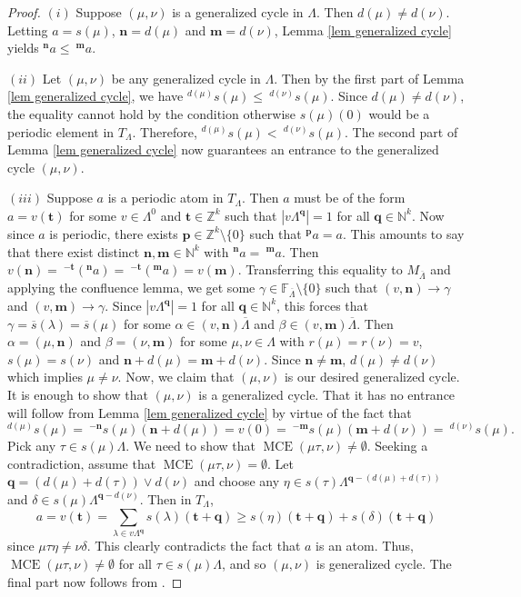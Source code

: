 \documentclass[a4paper,reqno,12pt]{amsart}
\numberwithin{equation}{section}
\theoremstyle{definition}
\theoremstyle{remark}
\newcommand{\MCE}{\operatorname{MCE}}
\newcommand{\N}{\mathbf{n}}
\newcommand{\M}{\mathbf{m}}
\newcommand{\bP}{\mathbf{p}}
\begin{document}
\begin{proof}
$(i)$ Suppose $(\mu,\nu)$ is a generalized cycle in $\Lambda$. Then $d(\mu)\neq d(\nu)$. Letting $a=s(\mu)$, $\N=d(\mu)$ and $\M=d(\nu)$, Lemma \ref{lem generalized cycle} yields $^\N a\le~^\M a$. 

$(ii)$ Let $(\mu,\nu)$ be any generalized cycle in $\Lambda$. Then by the first part of Lemma \ref{lem generalized cycle}, we have $^{d(\mu)}s(\mu)\le ~^{d(\nu)}s(\mu)$. Since $d(\mu)\neq d(\nu)$, the equality cannot hold by the condition otherwise $s(\mu)(0)$ would be a periodic element in $T_\Lambda$. Therefore, $^{d(\mu)}s(\mu)<~^{d(\nu)}s(\mu)$. The second part of Lemma \ref{lem generalized cycle} now guarantees an entrance to the generalized cycle $(\mu,\nu)$.

$(iii)$ Suppose $a$ is a periodic atom in $T_\Lambda$. Then $a$ must be of the form $a=v(\mathbf{t})$ for some $v\in \Lambda^0$ and $\mathbf{t}\in \mathbb{Z}^k$ such that $|v\Lambda^\mathbf{q}|=1$ for all $\mathbf{q}\in \mathbb{N}^k$. Now since $a$ is periodic, there exists $\bP\in \mathbb{Z}^k\setminus \{0\}$ such that $^\bP a=a$. This amounts to say that there exist distinct $\N,\M\in \mathbb{N}^k$ with $^\N a=~^\M a$. Then $v(\N)=~^{-\mathbf{t}}(^\N a)=~^{-\mathbf{t}}(^\M a)=v(\M)$. Transferring this equality to $M_{\overline{\Lambda}}$ and applying the confluence lemma, we get some $\gamma\in \mathbb{F}_{\overline{\Lambda}}\setminus \{0\}$ such that $(v,\N)\longrightarrow \gamma$ and $(v,\M)\longrightarrow \gamma$. Since $|v\Lambda^\mathbf{q}|=1$ for all $\mathbf{q}\in \mathbb{N}^k$, this forces that $\gamma=\overline{s}(\lambda)=\overline{s}(\mu)$ for some $\alpha\in (v,\N)\overline{\Lambda}$ and $\beta\in (v,\M)\overline{\Lambda}$. Then $\alpha=(\mu,\N)$ and $\beta=(\nu,\M)$ for some $\mu,\nu\in \Lambda$ with $r(\mu)=r(\nu)=v$, $s(\mu)=s(\nu)$ and $\N+d(\mu)=\M+d(\nu)$. Since $\N\neq \M$, $d(\mu)\neq d(\nu)$ which implies $\mu\neq \nu$. Now, we claim that $(\mu,\nu)$ is our desired generalized cycle. It is enough to show that $(\mu,\nu)$ is a generalized cycle. That it has no entrance will follow from Lemma \ref{lem generalized cycle} by virtue of the fact that \[^{d(\mu)}s(\mu)=~^{-\N}s(\mu)(\N+d(\mu))=v(0)=~^{-\M}s(\mu)(\M+d(\nu))=~^{d(\nu)}s(\mu).\] Pick any $\tau\in s(\mu)\Lambda$. We need to show that $\MCE(\mu\tau,\nu)\neq \emptyset$. Seeking a contradiction, assume that $\MCE(\mu\tau,\nu)=\emptyset$. Let $\mathbf{q}=(d(\mu)+d(\tau))\vee d(\nu)$ and choose any $\eta\in s(\tau)\Lambda^{\mathbf{q}-(d(\mu)+d(\tau))}$ and $\delta\in s(\mu)\Lambda^{\mathbf{q}-d(\nu)}$. Then in $T_\Lambda$, \[a=v(\mathbf{t})=\displaystyle{\sum_{\lambda\in v\Lambda^{\mathbf{q}}}} s(\lambda)(\mathbf{t}+\mathbf{q})\ge s(\eta)(\mathbf{t}+\mathbf{q})+s(\delta)(\mathbf{t}+\mathbf{q})\] since $\mu\tau\eta\neq \nu\delta$. This clearly contradicts the fact that $a$ is an atom. Thus, $\MCE(\mu\tau,\nu)\neq \emptyset$ for all $\tau\in s(\mu)\Lambda$, and so $(\mu,\nu)$ is generalized cycle. The final part now follows from \cite[Theorem 3.4]{Evans}.     
\end{proof}
\end{document}
